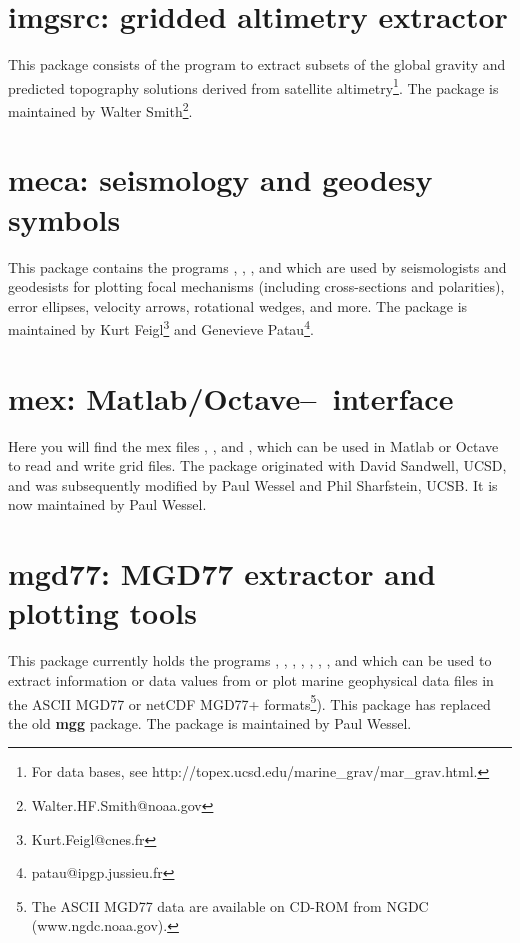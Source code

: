 \section{imgsrc: gridded altimetry extractor}

This package consists of the program  to
extract subsets of the global gravity and predicted topography
solutions derived from satellite altimetry\footnote{For data bases,
see http://topex.ucsd.edu/marine\_grav/mar\_grav.html.}.  The package
is maintained by Walter Smith\footnote{Walter.HF.Smith@noaa.gov}.

\section{meca: seismology and geodesy symbols}

This package contains the programs , ,
, and  which are used
by seismologists and geodesists for plotting focal mechanisms (including
cross-sections and polarities), error ellipses, velocity arrows, rotational
wedges, and more.  The package is maintained by
Kurt Feigl\footnote{Kurt.Feigl@cnes.fr} and
Genevieve Patau\footnote{patau@ipgp.jussieu.fr}.

\section{mex: Matlab/Octave--\gmt\ interface}

Here you will find the mex files , ,
and , which can be used in Matlab or Octave to read and write
grid files.  The package originated with David Sandwell, UCSD,
and was subsequently modified by Paul Wessel and Phil Sharfstein, UCSB.
It is now maintained by Paul Wessel.

\section{mgd77: MGD77 extractor and plotting tools}

This package currently holds the programs , , ,
, , , , and  which can be
used to extract information or data values from or plot marine geophysical
data files in the ASCII MGD77 or netCDF MGD77+ formats\footnote{The ASCII MGD77 data are available on CD-ROM from NGDC
(www.ngdc.noaa.gov).}).  This package has replaced the old \textbf{mgg} package.
The package is maintained by Paul Wessel.

